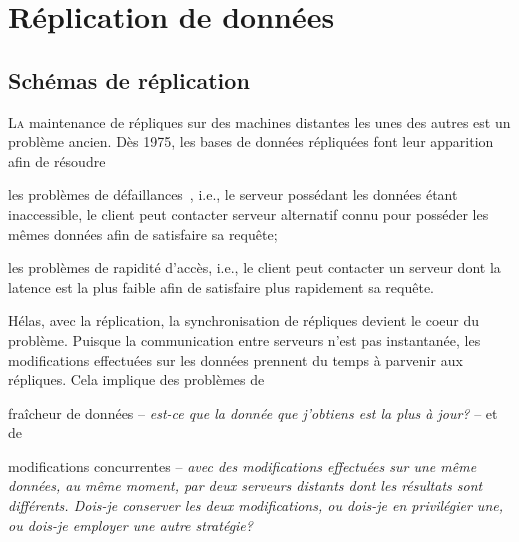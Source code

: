 
\part{Réplication de données}
\chapter{Schémas de réplication}

\lettrine{L}a maintenance de répliques sur des machines distantes les unes des
autres est un problème ancien. Dès 1975, les bases de données répliquées font
leur apparition~\cite{johnson1975maintenance} afin de résoudre
\begin{inparaenum}[(i)]
\item les problèmes de défaillances~\cite{alsberg1976principle}, i.e., le
  serveur possédant les données étant inaccessible, le client peut contacter
  serveur alternatif connu pour posséder les mêmes données afin de satisfaire sa
  requête;
\item les problèmes de rapidité d'accès, i.e., le client peut contacter un
  serveur dont la latence est la plus faible afin de satisfaire plus rapidement
  sa requête.
\end{inparaenum}

Hélas, avec la réplication, la synchronisation de répliques devient le coeur du
problème. Puisque la communication entre serveurs n'est pas instantanée, les
modifications effectuées sur les données prennent du temps à parvenir aux
répliques. Cela implique des problèmes de
\begin{inparaenum}[(i)]
\item fraîcheur de données -- \emph{est-ce que la donnée que j'obtiens est la
    plus à jour?} -- et de
\item modifications concurrentes -- \emph{avec des modifications effectuées sur
    une même données, au même moment, par deux serveurs distants dont les
    résultats sont différents. Dois-je conserver les deux modifications, ou
    dois-je en privilégier une, ou dois-je employer une autre stratégie?}
\end{inparaenum}

